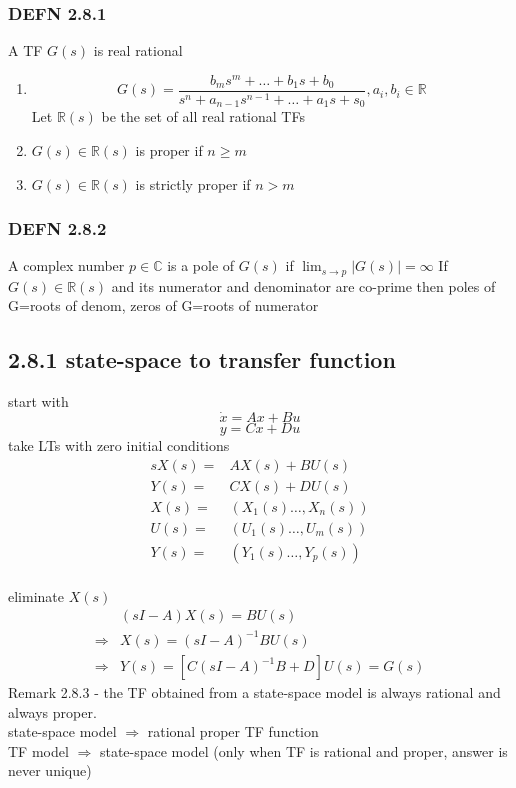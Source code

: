 \documentclass[letterpaper]{article}
\begin{document}
\subsubsection*{DEFN 2.8.1} A TF $G(s)$ is real rational
\begin{enumerate}
	\item $$G(s)=\frac{b_ms^m+\hdots+b_1s+b_0}{s^n+a_{n-1}s^{n-1}+\hdots+a_1s+s_0},a_i,b_i\in \mathbb{R}$$
	Let $\mathbb{R}(s)$ be the set of all real rational TFs
	\item $G(s)\in \mathbb{R}(s)$ is proper if $n\geq m$
	\item $G(s) \in \mathbb{R}(s)$ is strictly proper if $n > m$
\end{enumerate}
\subsubsection*{DEFN 2.8.2}
A complex number $p\in \mathbb{C}$ is a pole of $G(s)$ if $\lim_{s\rightarrow p}|G(s)|=\infty$
If $G(s)\in \mathbb{R}(s)$ and its numerator and denominator are co-prime then poles of G=roots of denom, zeros of G=roots of numerator		    
		    
\subsection*{2.8.1 state-space to transfer function}
start with $$\dot x=Ax+Bu$$$$y=Cx+Du$$
take LTs with zero initial conditions
\begin{align*}
sX(s)=&AX(s)+BU(s)\\
Y(s)=&CX(s)+DU(s)\\
X(s)=&(X_1(s)\hdots,X_n(s))\\
U(s)=&(U_1(s)\hdots,U_m(s))\\
Y(s)=&(Y_1(s)\hdots,Y_p(s))\\
\end{align*}	    

eliminate $X(s)$
\begin{align*}
&(sI-A)X(s)=BU(s)\\
\Rightarrow&X(s)=(sI-A)^{-1}BU(s)\\
\Rightarrow&Y(s)=[C(sI-A)^{-1}B+D]U(s)=G(s)
\end{align*}
Remark 2.8.3 - the TF obtained from a state-space model is always rational and always proper.\\
state-space model $\Rightarrow$ rational proper TF function\\
TF model $\Rightarrow$ state-space model (only when TF is rational and proper, answer is never unique)
\end{document}
